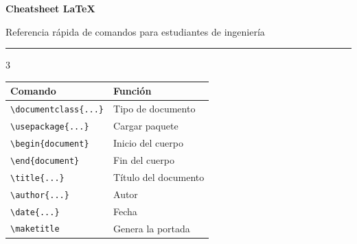\documentclass[10pt,landscape]{article}
\newcommand{\comando}[1]{\texttt{\textcolor{azulprofundo}{#1}}}
\begin{document}
\begin{center}
    {\Huge \textbf{Cheatsheet \LaTeX}}
    \vspace{0.2cm}
    
    {\large Referencia rápida de comandos para estudiantes de ingeniería}
    \vspace{0.5cm}
    
    \rule{0.8\textwidth}{0.5pt}
\end{center}

\begin{multicols}{3}

\tcbox[colback=grisclaro, colframe=azulprofundo, arc=3pt, boxsep=2pt, left=2pt, right=2pt, top=2pt, bottom=2pt]{
    \textbf{\textcolor{azulprofundo}{📄 ESTRUCTURA DEL DOCUMENTO}}
}
\vspace{0.3cm}

\begin{tabular}{@{}ll@{}}
    \toprule
    \textbf{Comando} & \textbf{Función} \\
    \midrule
    \comando{\textbackslash documentclass\{...\}} & Tipo de documento \\
    \comando{\textbackslash usepackage\{...\}} & Cargar paquete \\
    \comando{\textbackslash begin\{document\}} & Inicio del cuerpo \\
    \comando{\textbackslash end\{document\}} & Fin del cuerpo \\
    \comando{\textbackslash title\{...\}} & Título del documento \\
    \comando{\textbackslash author\{...\}} & Autor \\
    \comando{\textbackslash date\{...\}} & Fecha \\
    \comando{\textbackslash maketitle} & Genera la portada \\
    \bottomrule
\end{tabular}

\vspace{0.5cm}

\tcbox[colback=grisclaro, colframe=azulprofundo, arc=3pt, boxsep=2pt, left=2pt, right=2pt, top=2pt, bottom=2pt]{
    \textbf{\textcolor{azulprofundo}{📚 CLASES DE DOCUMENTO}}
}
\vspace{0.3cm}


\end{multicols}
\end{document}

